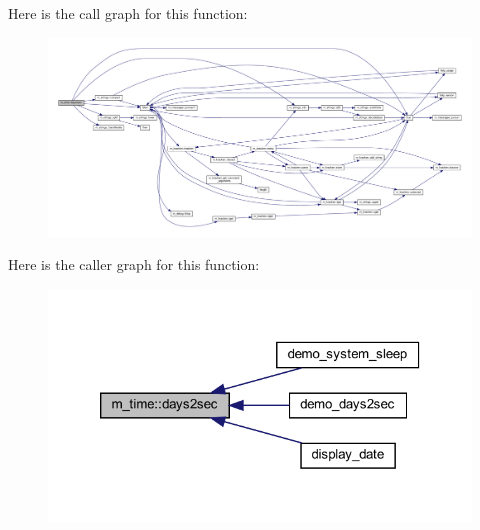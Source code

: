 Here is the call graph for this function\+:
\nopagebreak
\begin{figure}[H]
\begin{center}
\leavevmode
\includegraphics[width=350pt]{namespacem__time_a99393c7906f1989f90ece03969224938_cgraph}
\end{center}
\end{figure}
Here is the caller graph for this function\+:
\nopagebreak
\begin{figure}[H]
\begin{center}
\leavevmode
\includegraphics[width=320pt]{namespacem__time_a99393c7906f1989f90ece03969224938_icgraph}
\end{center}
\end{figure}
\mbox{\label{namespacem__time_adfda8a89820b8d0ad4581a14896e4ce5}} 
